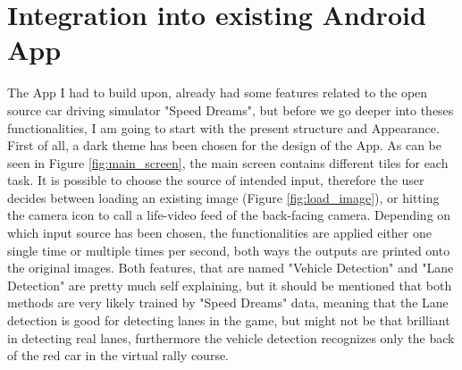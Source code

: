 
\chapter{Integration into existing Android App}\label{chapter:Integration into existing App}


The App I had to build upon, already had some features related to the open source car driving simulator "Speed Dreams", but before we go deeper into theses functionalities, I am going to start with the present structure and Appearance.
First of all, a dark theme has been chosen for the design of the App. As can be seen in Figure \ref{fig:main_screen}, the main screen contains different tiles for each task. It is possible to choose the source of intended input, therefore the user decides between loading an existing image (Figure \ref{fig:load_image}), or hitting the camera icon to call a life-video feed of the back-facing camera. Depending on which input source has been chosen, the functionalities are applied either one single time or multiple times per second, both ways the outputs are printed onto the original images. Both features, that are named "Vehicle Detection" and "Lane Detection" are pretty much self explaining, but it should be mentioned that both methods are very likely trained by "Speed Dreams" data, meaning that the Lane detection is good for detecting lanes in the game, but might not be that brilliant in detecting real lanes, furthermore the vehicle detection recognizes only the back of the red car in the virtual rally course. 


